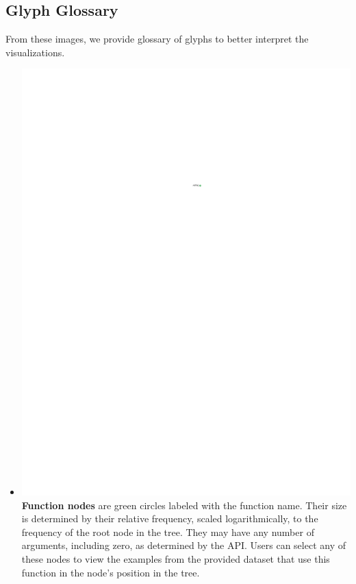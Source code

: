\documentclass[conference]{IEEEtran}
\begin{document}
	\subsection{Glyph Glossary}
	
	From these images, we provide glossary of glyphs to better interpret the visualizations. \begin{itemize} \item
		\includegraphics{glossary-green} \textbf{Function nodes} are green circles
		labeled with the function name. Their size is determined by their relative
		frequency, scaled logarithmically, to the frequency of the root node in the
		tree. They may have any number of arguments, including zero, as determined by
		the API. Users can select any of these nodes to view the examples from the
		provided dataset that use this function in the node's position in the tree.
		

\end{itemize}
\end{document}
